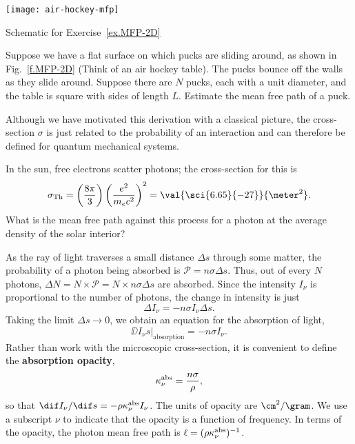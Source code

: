 \begin{marginfigure}[3\baselineskip]
    \texttt{[image: air-hockey-mfp]}
    \caption[Mean free path of a hockey puck]{\label{f.MFP-2D}Schematic for Exercise~\ref{ex.MFP-2D}}
\end{marginfigure}
\begin{exercisebox}\label{ex.MFP-2D}
    Suppose we have a flat surface on which pucks are sliding around, as shown in Fig.~\ref{f.MFP-2D} (Think of an air hockey table). The pucks bounce off the walls as they slide around.  Suppose there are $N$ pucks, each with a unit diameter, and the table is square with sides of length $L$.  Estimate the mean free path of a puck.
\end{exercisebox}

Although we have motivated this derivation with a classical picture, the cross-section $\sigma$ is just related to the probability of an interaction and can therefore be defined for quantum mechanical systems.

\begin{exercisebox}\label{ex.MFP}
    In the sun, free electrons scatter photons; the cross-section for this is
    \[
    \sigma_{\mathrm{Th}} = \left(\frac{8\pi}{3}\right)\left(\frac{e^2}{m_e c^2}\right)^2 = \val{\sci{6.65}{-27}}{\meter^2}.
    \]
    What is the mean free path against this process for a photon at the average density of the solar interior?
\end{exercisebox}

As the ray of light traverses a small distance $\Delta s$ through some matter, the probability of a photon being absorbed is $\mathcal{P} = n\sigma\Delta s$. Thus, out of every $N$ photons, $\Delta N = N \times\mathcal{P} = N\times n\sigma\Delta s$ are absorbed. Since the intensity $I_{\nu}$ is proportional to the number of photons, the change in intensity is just
\[ \Delta I_{\nu} = -n\sigma I_{\nu}\Delta s. \]
Taking the limit $\Delta s\to0$, we obtain an equation for the absorption of light,
\begin{equation}\label{e.absorption-microscopic}
\left.\DD{I_{\nu}}{s}\right|_{\mathrm{absorption}} = -n\sigma I_{\nu}.
\end{equation}
Rather than work with the microscopic cross-section, it is convenient to define the \textbf{absorption opacity},
\[
	\kappa_\nu^{\mathrm{abs}} = \frac{n\sigma}{\rho},
\]
so that $\dif I_{\nu}/\dif s = -\rho\kapabs I_{\nu}$. The units of opacity are $\cm^{2}/\gram$. We use a subscript $\nu$ to indicate that the opacity is a function of frequency. In terms of the opacity, the photon mean free path is $\ell = (\rho\kappa_\nu^{\mathrm{abs}})^{-1}$.

